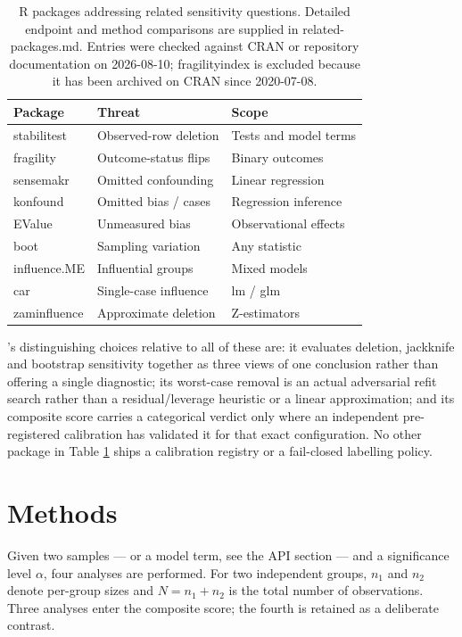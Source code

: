 \begin{table}

\caption{\label{tab:related}R packages addressing related sensitivity questions. Detailed endpoint and method comparisons are supplied in related-packages.md. Entries were checked against CRAN or repository documentation on 2026-08-10; fragilityindex is excluded because it has been archived on CRAN since 2020-07-08.}
\centering
\begin{tabular}[t]{lll}
\toprule
Package & Threat & Scope\\
\midrule
stabilitest & Observed-row deletion & Tests and model terms\\
fragility & Outcome-status flips & Binary outcomes\\
sensemakr & Omitted confounding & Linear regression\\
konfound & Omitted bias / cases & Regression inference\\
EValue & Unmeasured bias & Observational effects\\
\addlinespace
boot & Sampling variation & Any statistic\\
influence.ME & Influential groups & Mixed models\\
car & Single-case influence & lm / glm\\
zaminfluence & Approximate deletion & Z-estimators\\
\bottomrule
\end{tabular}
\end{table}

's distinguishing choices relative to all of these are: it
evaluates deletion, jackknife and bootstrap sensitivity together as three
views of one conclusion rather than offering a single diagnostic; its
worst-case removal is an actual adversarial refit search rather than a
residual/leverage heuristic or a linear approximation; and its composite score
carries a categorical verdict only where an independent pre-registered
calibration has validated it for that exact configuration. No other package in
Table \ref{tab:related} ships a calibration registry or a fail-closed
labelling policy.

\section{Methods}\label{methods}

Given two samples --- or a model term, see the API section --- and a
significance level \(\alpha\), four analyses are performed. For two independent
groups, \(n_1\) and \(n_2\) denote per-group sizes and \(N=n_1+n_2\) is the total
number of observations. Three analyses enter the composite score; the fourth
is retained as a deliberate contrast.

